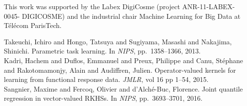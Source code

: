 \begin{poster}
\begin{posterbox}[name=references, column=0,span=2,
                  headerColorOne=white,below=vv-rkhs
                  ]{\footnotesize{\normalfont This work was supported by the Labex DigiCosme (project ANR-11-LABEX-0045-
DIGICOSME) and the industrial chair Machine Learning for Big Data at T{\'e}l{\'e}com ParisTech.}}
{\begin{thebibliography}{1}
Takeuchi, Ichiro and Hongo, Tatsuya and Sugiyama, Masashi and Nakajima, Shinichi.
\newblock Parametric task learning.
\newblock In \emph{NIPS}, pp.\  1358--1366, 2013.
\\[-0.5cm]

Kadri, Hachem and Duflos, Emmanuel and Preux, Philippe and Canu, St{\'e}phane and Rakotomamonjy, Alain and Audiffren, Julien.
\newblock Operator-valued kernels for learning from functional response data.
\newblock  \emph{JMLR}, vol 16 pp 1--54, 2015.
\\[-0.5cm]


Sangnier, Maxime and Fercoq, Olivier and d'Alch{\'e}-Buc, Florence.
\newblock Joint quantile regression in vector-valued RKHSs.
\newblock In \emph{NIPS}, pp.\  3693--3701, 2016.


\end{thebibliography}
}
\end{posterbox}


\end{poster}

